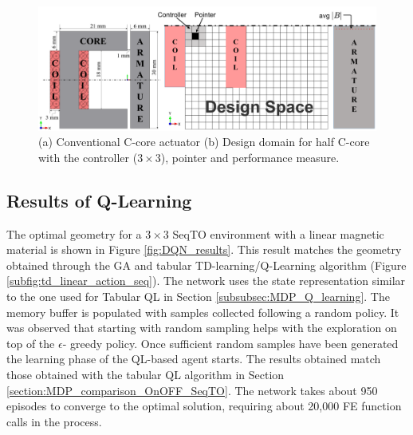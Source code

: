 \begin{figure}[h!]
    \centering
    \includegraphics[width=\textwidth]{Figures/Ch_RL/c_core_conventional_design_domain.png}
    \caption{(a) Conventional C-core actuator (b) Design domain for half C-core with the controller ($3 \times 3$), pointer and performance measure.}
    \label{fig:RL_c_core_conventional_design_domain}
\end{figure}

\subsection{Results of Q-Learning}

The optimal geometry for a $3 \times 3$ SeqTO environment with a linear magnetic material is shown in Figure \ref{fig:DQN_results}. This result matches the geometry obtained through the GA and tabular TD-learning/Q-Learning algorithm (Figure \ref{subfig:td_linear_action_seq}).
The network uses the state representation similar to the one used for Tabular QL in Section \ref{subsubsec:MDP_Q_learning}. The memory buffer is populated with samples collected following a random policy. It was observed that starting with random sampling helps with the exploration on top of the $\epsilon$- greedy policy. Once sufficient random samples have been generated the learning phase of the QL-based agent starts. The results obtained match those obtained with the tabular QL algorithm in Section \ref{section:MDP_comparison_OnOFF_SeqTO}. The network takes about 950 episodes to converge to the optimal solution, requiring about 20,000 FE function calls in the process.

